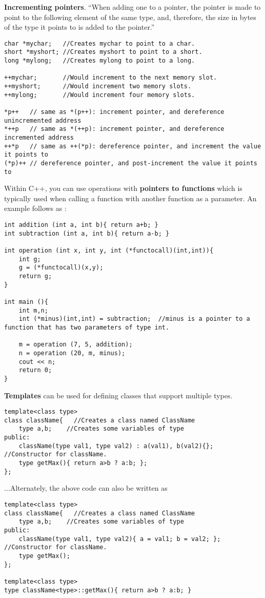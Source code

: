 \textbf{Incrementing pointers}. ``When adding one to a pointer, the pointer is made to point to the following element of the same type, and, therefore, the size in bytes of the type it points to is added to the pointer.''
\begin{lstlisting}
char *mychar;   //Creates mychar to point to a char.
short *myshort; //Creates myshort to point to a short.
long *mylong;   //Creates mylong to point to a long.

++mychar;       //Would increment to the next memory slot.
++myshort;      //Would increment two memory slots.
++mylong;       //Would increment four memory slots.

*p++   // same as *(p++): increment pointer, and dereference unincremented address
*++p   // same as *(++p): increment pointer, and dereference incremented address
++*p   // same as ++(*p): dereference pointer, and increment the value it points to
(*p)++ // dereference pointer, and post-increment the value it points to 
\end{lstlisting}

Within C++, you can use operations with \textbf{pointers to functions} which is typically used when calling a function with another function as a parameter. An example follows as \cite{cpp:pointers}:
\begin{lstlisting}
int addition (int a, int b){ return a+b; }
int subtraction (int a, int b){ return a-b; }

int operation (int x, int y, int (*functocall)(int,int)){
	int g;
	g = (*functocall)(x,y);
	return g;
}

int main (){
	int m,n;
	int (*minus)(int,int) = subtraction;  //minus is a pointer to a function that has two parameters of type int.
	
	m = operation (7, 5, addition);
	n = operation (20, m, minus);
	cout << n;
	return 0;
}
\end{lstlisting}

\textbf{Templates} can be used for defining classes that support multiple types. 
\begin{lstlisting}
template<class type>
class className{   //Creates a class named ClassName
	type a,b;    //Creates some variables of type
public:
	className(type val1, type val2) : a(val1), b(val2){};  //Constructor for className.
	type getMax(){ return a>b ? a:b; };
};
\end{lstlisting}
...Alternately, the above code can also be written as
\begin{lstlisting}
template<class type>
class className{   //Creates a class named ClassName
	type a,b;    //Creates some variables of type
public:
	className(type val1, type val2){ a = val1; b = val2; };  //Constructor for className.
	type getMax();
};

template<class type>
type className<type>::getMax(){ return a>b ? a:b; }
\end{lstlisting}

